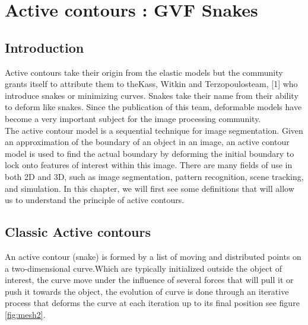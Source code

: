 \pagestyle{fancy}
\chapter{Active contours : GVF Snakes}\label{ch:active-contours-:-gvf-snakes}
\chead{}
\lhead{\bfseries \chaptername {\,} \thechapter }
\cfoot{\bfseries \thepage}
\rhead{}

\section{Introduction}\label{sec:introduction-ch2}
\hspace{1cm}Active contours take their origin from the elastic models but the
community grants itself to attribute them to theKass, Witkin and
Terzopoulosteam, [1] who introduce snakes or minimizing curves. Snakes take
their name from their ability to deform like snakes. Since the publication of this
team, deformable models have become a very important subject for the image
processing community.\\
\hspace{1cm}The active contour model is a sequential technique for image segmentation.
Given an approximation of the boundary of an object in an image, an active
contour model is used to find the actual boundary by deforming the initial
boundary to lock onto features of interest within this image. There are many
fields of use in both 2D and 3D, such as image segmentation, pattern
recognition, scene tracking, and simulation. In this chapter, we will first see
some definitions that will allow us to understand the principle of active
contours.

\section{Classic Active contours}\label{sec:classic-active-contours}

\hspace{1cm}An active contour (snake) is formed by a list of moving and distributed points
on a two-dimensional curve.Which are typically initialized outside the object of
interest, the curve move under the influence of several forces that will pull it or
push it towards the object, the evolution of curve is done through an iterative
process that deforms the curve at each iteration up to its final position see figure \ref{fig:mesh2}.

